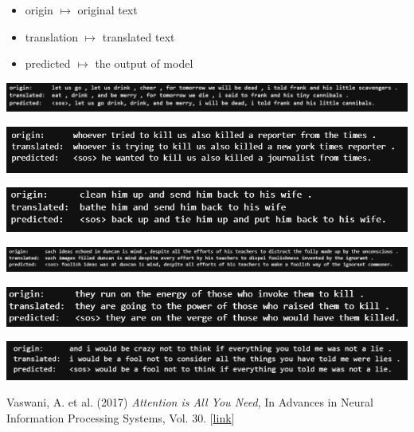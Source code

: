 \documentclass{article}
\begin{document}
\begin{itemize}
    \item origin $\mapsto$ original text
    \item translation $\mapsto$ translated text
    \item predicted $\mapsto$ the output of model
\end{itemize}

\includegraphics[scale=0.42]{figures/Transformer_result_1.png}

\includegraphics[scale=0.42]{figures/Transformer_result_2.png}

\includegraphics[scale=0.42]{figures/Transformer_result_3.png}

\includegraphics[scale=0.5]{figures/Transformer_result_4.png}

\includegraphics[scale=0.45]{figures/Transformer_result_5.png}

\includegraphics[scale=0.42]{figures/Transformer_result_6.png}



\begin{thebibliography}{1}

Vaswani, A. et al. (2017) \emph{Attention is All You Need}, In Advances in Neural Information Processing Systems, Vol. 30. [\href{https://papers.nips.cc/paper_files/paper/2017/hash/3f5ee243547dee91fbd053c1c4a845aa-Abstract.html}{link}]

\end{thebibliography}
\end{document}
